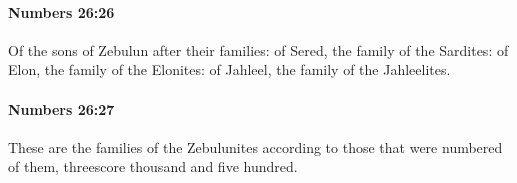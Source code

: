 		\paragraph{Numbers 26:26} %
			\label{NUMBERS-26-26}

			Of the sons of Zebulun after their families: of Sered, the family of the Sardites: of Elon, the family of the Elonites: of Jahleel, the family of the Jahleelites.


		\paragraph{Numbers 26:27} %
			\label{NUMBERS-26-27}

			These are the families of the Zebulunites according to those that were numbered of them, threescore thousand and five hundred.


